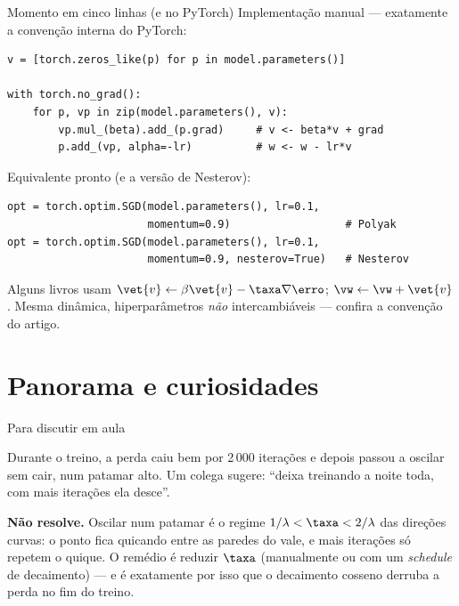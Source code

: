 \documentclass[aspectratio=169, 11pt]{beamer}
\begin{document}
\begin{frame}[fragile]{Momento em cinco linhas (e no PyTorch)}
  Implementação manual — exatamente a convenção interna do PyTorch:

  \begin{lstlisting}
v = [torch.zeros_like(p) for p in model.parameters()]

with torch.no_grad():
    for p, vp in zip(model.parameters(), v):
        vp.mul_(beta).add_(p.grad)     # v <- beta*v + grad
        p.add_(vp, alpha=-lr)          # w <- w - lr*v
  \end{lstlisting}

  Equivalente pronto (e a versão de Nesterov):

  \begin{lstlisting}
opt = torch.optim.SGD(model.parameters(), lr=0.1,
                      momentum=0.9)                  # Polyak
opt = torch.optim.SGD(model.parameters(), lr=0.1,
                      momentum=0.9, nesterov=True)   # Nesterov
  \end{lstlisting}

  \smallskip
  {\small Alguns livros usam \(\vet{v} \leftarrow \beta\vet{v} - \taxa
  \nabla\erro\); \(\vw \leftarrow \vw + \vet{v}\). Mesma dinâmica,
  hiperparâmetros \emph{não} intercambiáveis — confira a convenção do artigo.}
\end{frame}

\section{Panorama e curiosidades}

\begin{frame}{Para discutir em aula}
  \begin{quizbox}
    Durante o treino, a perda caiu bem por 2\,000 iterações e depois passou a
    oscilar sem cair, num patamar alto. Um colega sugere: ``deixa treinando a
    noite toda, com mais iterações ela desce''.

    \smallskip
  \end{quizbox}

  \pause

  \begin{respbox}
    \textbf{Não resolve.} Oscilar num patamar é o regime
    \(1/\lambda < \taxa < 2/\lambda\) das direções curvas: o ponto fica quicando
    entre as paredes do vale, e mais iterações só repetem o quique. O remédio é
    \alert{reduzir \(\taxa\)} (manualmente ou com um \emph{schedule} de
    decaimento) — e é exatamente por isso que o decaimento cosseno derruba a
    perda no fim do treino.
  \end{respbox}
\end{frame}
\end{document}
